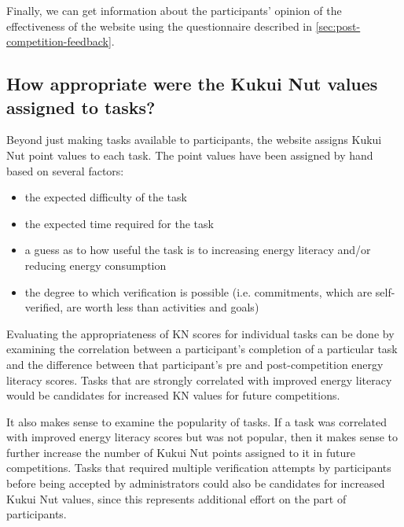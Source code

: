 Finally, we can get information about the participants' opinion of the effectiveness of the website using the questionnaire described in \autoref{sec:post-competition-feedback}.

\subsection{How appropriate were the Kukui Nut values assigned to tasks?}

Beyond just making tasks available to participants, the website assigns Kukui Nut point values to each task. The point values have been assigned by hand based on several factors:

\begin{itemize}
	\item the expected difficulty of the task
	\item the expected time required for the task
	\item a guess as to how useful the task is to increasing energy literacy and/or reducing energy consumption
	\item the degree to which verification is possible (i.e. commitments, which are self-verified, are worth less than activities and goals)
\end{itemize}


Evaluating the appropriateness of KN scores for individual tasks can be done by examining the correlation between a participant's completion of a particular task and the difference between that participant's pre and post-competition energy literacy scores. Tasks that are strongly correlated with improved energy literacy would be candidates for increased KN values for future competitions.

It also makes sense to examine the popularity of tasks. If a task was correlated with improved energy literacy scores but was not popular, then it makes sense to further increase the number of Kukui Nut points assigned to it in future competitions. Tasks that required multiple verification attempts by participants before being accepted by administrators could also be candidates for increased Kukui Nut values, since this represents additional effort on the part of participants.

